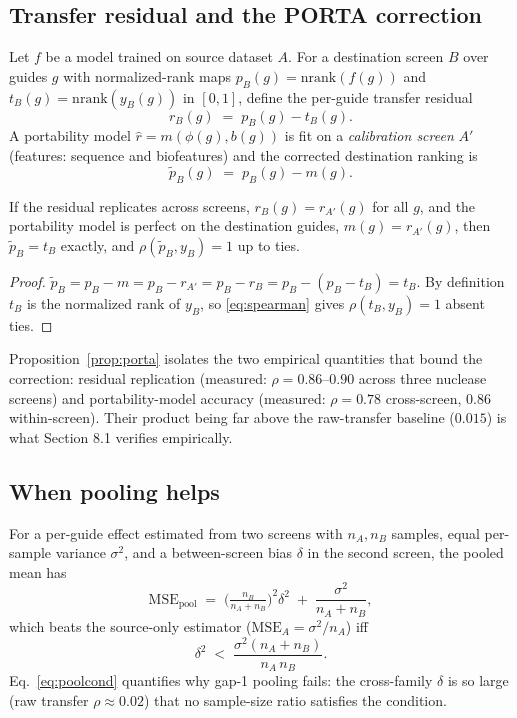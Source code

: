 \subsection{Transfer residual and the PORTA correction}
Let $f$ be a model trained on source dataset $A$. For a destination
screen $B$ over guides $g$ with normalized-rank maps $p_B(g) =
\mathrm{nrank}(f(g))$ and $t_B(g) = \mathrm{nrank}(y_B(g))$ in $[0,1]$,
define the per-guide transfer residual
\begin{equation}
r_B(g) \;=\; p_B(g) - t_B(g).
\label{eq:resid}
\end{equation}
A portability model $\hat r = m(\phi(g), b(g))$ is fit on a
\emph{calibration screen} $A'$ (features: sequence and biofeatures) and
the corrected destination ranking is
\begin{equation}
\tilde p_B(g) \;=\; p_B(g) - m(g).
\label{eq:porta}
\end{equation}
\begin{proposition}
\label{prop:porta}
If the residual replicates across screens, $r_B(g) = r_{A'}(g)$ for all
$g$, and the portability model is perfect on the destination guides,
$m(g) = r_{A'}(g)$, then $\tilde p_B = t_B$ exactly, and
$\rho(\tilde p_B, y_B) = 1$ up to ties.
\end{proposition}
\begin{proof}
$\tilde p_B = p_B - m = p_B - r_{A'} = p_B - r_B = p_B - (p_B - t_B) =
t_B$. By definition $t_B$ is the normalized rank of $y_B$, so
\eqref{eq:spearman} gives $\rho(t_B, y_B) = 1$ absent ties.
\end{proof}
Proposition~\ref{prop:porta} isolates the two empirical quantities that
bound the correction: residual replication (measured: $\rho = 0.86$--$0.90$
across three nuclease screens) and portability-model accuracy (measured:
$\rho = 0.78$ cross-screen, $0.86$ within-screen). Their product being
far above the raw-transfer baseline ($0.015$) is what Section 8.1
verifies empirically.

\subsection{When pooling helps}
For a per-guide effect estimated from two screens with $n_A, n_B$
samples, equal per-sample variance $\sigma^2$, and a between-screen bias
$\delta$ in the second screen, the pooled mean has
\begin{equation}
\mathrm{MSE}_{\mathrm{pool}} \;=\;
\Big(\tfrac{n_B}{n_A + n_B}\Big)^{\!2} \delta^2 \;+\; \frac{\sigma^2}{n_A + n_B},
\label{eq:pool}
\end{equation}
which beats the source-only estimator ($\mathrm{MSE}_A = \sigma^2/n_A$)
iff
\begin{equation}
\delta^2 \;<\; \frac{\sigma^2 (n_A + n_B)}{n_A\, n_B}.
\label{eq:poolcond}
\end{equation}
Eq.~\eqref{eq:poolcond} quantifies why gap-1 pooling fails: the
cross-family $\delta$ is so large (raw transfer $\rho \approx 0.02$) that
no sample-size ratio satisfies the condition.

